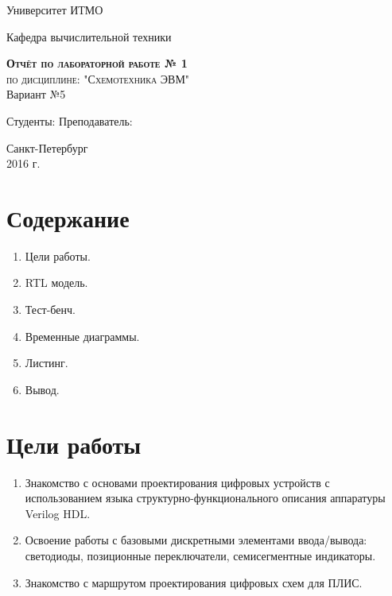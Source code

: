 \documentclass[a4paper, 10pt]{article}
\begin{document}
    \begin{titlepage}
        \begin{center}
            \large
            Университет ИТМО
            \vspace{3cm}


            Кафедра вычислительной техники
            \vspace{4cm}

            \textsc{ \textbf{Отчёт по лабораторной работе  № 1} \\ по дисциплине: "Схемотехника ЭВМ"}\\Вариант №5\\[8mm]

            \bigskip
        \end{center}
        \vspace{3cm}

        \hfill\begin{flushright}
             Студенты:
             \vfill
             Преподаватель:
        \end{flushright}
        \vfill
        \vfill
        \vfill
        \vfill
        \vfill
        \begin{center}
            Санкт-Петербург \\2016 г.
        \end{center}
    \end{titlepage}
   \newpage
    \section*{Содержание}
        \begin{enumerate}
            \item Цели работы.
            \item RTL модель.
            \item Тест-бенч.
            \item Временные диаграммы.
            \item Листинг.
            \item Вывод.
        \end{enumerate}

    \section*{Цели работы}

        \begin{enumerate}
            \item Знакомство с основами проектирования цифровых устройств с использованием языка структурно-функционального описания аппаратуры Verilog HDL.
            \item Освоение работы с базовыми дискретными элементами ввода/вывода: светодиоды, позиционные переключатели, семисегментные индикаторы. 
            \item Знакомство с маршрутом проектирования цифровых схем для ПЛИС. 
        \end{enumerate} 
\end{document}
